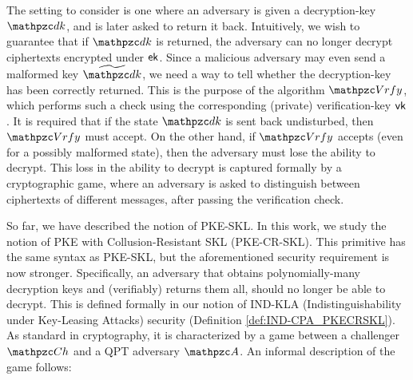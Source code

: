 The setting to consider is one where an adversary is given a
decryption-key $\qdk$, and is later asked to return it back.
Intuitively, we wish to guarantee that if $\qdk$ is returned, the
adversary can no longer decrypt ciphertexts
encrypted under $\mathsf{ek}$. Since a malicious adversary may
even send a malformed key $\widetilde{\qdk}$, we need a way to tell
whether the decryption-key has been correctly returned.  This
is the purpose of the algorithm $\qVrfy$, which performs such a check
using the corresponding (private) verification-key $\mathsf{vk}$.  It is
required that if the state $\qdk$ is sent back undisturbed, then
$\qVrfy$ must accept. On the other hand, if $\qVrfy$ accepts (even for
a possibly malformed state), then the adversary must lose the ability
to decrypt. This loss in the ability to decrypt is captured formally
by a cryptographic game, where an adversary is asked to distinguish
between ciphertexts of different messages, after passing the
verification check.

So far, we have described the notion of PKE-SKL. In this work, we
study the notion of PKE with Collusion-Resistant SKL (PKE-CR-SKL).
This primitive has the same syntax as PKE-SKL, but the aforementioned
security requirement is now stronger. Specifically, an adversary that
obtains polynomially-many decryption keys and (verifiably) returns
them all, should no longer be able to decrypt. This is defined formally
in our notion of IND-KLA (Indistinguishability under Key-Leasing
Attacks) security (Definition \ref{def:IND-CPA_PKECRSKL}). As standard
in cryptography, it is characterized by a game between a challenger
$\qCh$ and a QPT adversary $\qA$. An informal description of the game
follows:

